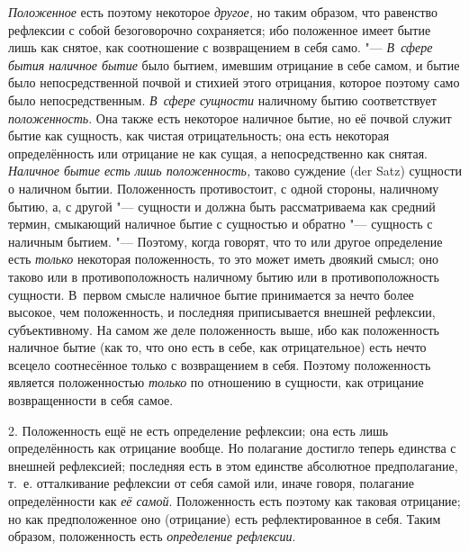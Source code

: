 {\em Положенное} есть поэтому некоторое
{\em другое,} но таким образом, что равенство рефлексии
с собой безоговорочно сохраняется; ибо положенное имеет бытие лишь как
снятое, как соотношение с возвращением в себя само. "---
{\em В~сфере бытия наличное бытие} было бытием, имевшим
отрицание в себе самом, и бытие было непосредственной почвой и стихией
этого отрицания, которое поэтому само было непосредственным.
{\em В~сфере сущности} наличному бытию соответствует
{\em положенность}. Она также есть некоторое наличное
бытие, но её почвой служит бытие как сущность, как чистая отрицательность;
она есть некоторая определённость или отрицание не как сущая, а
непосредственно как снятая. {\em Наличное бытие есть
лишь положенность,} таково суждение (der Satz) сущности о наличном бытии.
Положенность противостоит, с одной стороны, наличному бытию, а, с другой
"--- сущности и должна быть рассматриваема как средний термин, смыкающий
наличное бытие с сущностью и обратно "--- сущность с наличным бытием. "---
Поэтому, когда говорят, что то или другое определение есть
{\em только} некоторая положенность, то это может иметь
двоякий смысл; оно таково или в противоположность наличному бытию или в
противоположность сущности. В~первом смысле наличное бытие принимается за
нечто более высокое, чем положенность, и последняя приписывается внешней
рефлексии, субъективному. На самом же деле положенность выше, ибо как
положенность наличное бытие (как то, что оно есть в себе, как
отрицательное) есть нечто всецело соотнесённое только с возвращением в
себя. Поэтому положенность является положенностью
{\em только} по отношению в сущности, как отрицание
возвращенности в себя самое.

2. Положенность ещё не есть определение рефлексии; она есть лишь
определённость как отрицание вообще. Но полагание достигло теперь единства
с внешней рефлексией; последняя есть в этом единстве абсолютное
предполагание, т.~е. отталкивание рефлексии от себя самой или, иначе
говоря, полагание определённости как {\em её самой}.
Положенность есть поэтому как таковая отрицание; но как предположенное оно
(отрицание) есть рефлектированное в себя. Таким образом, положенность есть
{\em определение рефлексии}.

